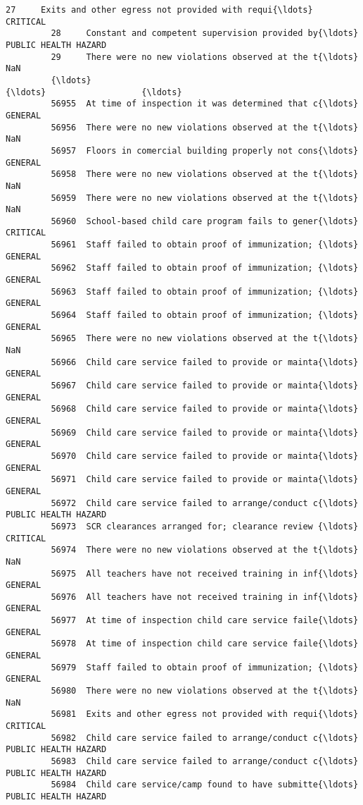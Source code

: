\documentclass[11pt]{article}
\begin{document}
\begin{Verbatim}[commandchars=\\\{\}]
         27     Exits and other egress not provided with requi{\ldots}              CRITICAL  
         28     Constant and competent supervision provided by{\ldots}  PUBLIC HEALTH HAZARD  
         29     There were no new violations observed at the t{\ldots}                   NaN  
         {\ldots}                                                  {\ldots}                   {\ldots}  
         56955  At time of inspection it was determined that c{\ldots}               GENERAL  
         56956  There were no new violations observed at the t{\ldots}                   NaN  
         56957  Floors in comercial building properly not cons{\ldots}               GENERAL  
         56958  There were no new violations observed at the t{\ldots}                   NaN  
         56959  There were no new violations observed at the t{\ldots}                   NaN  
         56960  School-based child care program fails to gener{\ldots}              CRITICAL  
         56961  Staff failed to obtain proof of immunization; {\ldots}               GENERAL  
         56962  Staff failed to obtain proof of immunization; {\ldots}               GENERAL  
         56963  Staff failed to obtain proof of immunization; {\ldots}               GENERAL  
         56964  Staff failed to obtain proof of immunization; {\ldots}               GENERAL  
         56965  There were no new violations observed at the t{\ldots}                   NaN  
         56966  Child care service failed to provide or mainta{\ldots}               GENERAL  
         56967  Child care service failed to provide or mainta{\ldots}               GENERAL  
         56968  Child care service failed to provide or mainta{\ldots}               GENERAL  
         56969  Child care service failed to provide or mainta{\ldots}               GENERAL  
         56970  Child care service failed to provide or mainta{\ldots}               GENERAL  
         56971  Child care service failed to provide or mainta{\ldots}               GENERAL  
         56972  Child care service failed to arrange/conduct c{\ldots}  PUBLIC HEALTH HAZARD  
         56973  SCR clearances arranged for; clearance review {\ldots}              CRITICAL  
         56974  There were no new violations observed at the t{\ldots}                   NaN  
         56975  All teachers have not received training in inf{\ldots}               GENERAL  
         56976  All teachers have not received training in inf{\ldots}               GENERAL  
         56977  At time of inspection child care service faile{\ldots}               GENERAL  
         56978  At time of inspection child care service faile{\ldots}               GENERAL  
         56979  Staff failed to obtain proof of immunization; {\ldots}               GENERAL  
         56980  There were no new violations observed at the t{\ldots}                   NaN  
         56981  Exits and other egress not provided with requi{\ldots}              CRITICAL  
         56982  Child care service failed to arrange/conduct c{\ldots}  PUBLIC HEALTH HAZARD  
         56983  Child care service failed to arrange/conduct c{\ldots}  PUBLIC HEALTH HAZARD  
         56984  Child care service/camp found to have submitte{\ldots}  PUBLIC HEALTH HAZARD  
         

\end{Verbatim}
\end{document}
